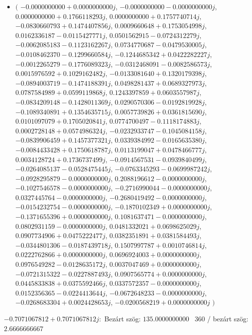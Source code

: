 \documentclass[14pt,a4paper]{article}
\begin{document}
\begin{itemize}
\item
$\big($
$-0.0000000000+0.0000000000j$, $-0.0000000000-0.0000000000j$, $0.0000000000+0.1766118293j$, $0.0000000000+0.1757740714j$, $-0.0830660793+0.1474407856j$, $0.0009660648+0.1753054998j$, $0.0162336187-0.0115427771j$, $0.0501562915-0.0724312279j$, $-0.0062085183-0.1123162267j$, $0.0734770687-0.0479530005j$, $-0.0108462370-0.1299660584j$, $-0.1244685342+0.0422282227j$, $-0.0012265279-0.1776089323j$, $-0.0312468091-0.0082586573j$, $0.0015976592+0.1029162482j$, $-0.0133081640+0.1320179398j$, $-0.0894003719-0.1474188391j$, $0.0498281437+0.0689327973j$, $0.0787584989+0.0599119868j$, $0.1243397859+0.0603557987j$, $-0.0834209148-0.1428011369j$, $0.0290570306-0.0192819928j$, $-0.1089340891+0.1354635715j$, $0.0057739826+0.0361815690j$, $0.0101097079+0.1705020841j$, $0.0774700497-0.1118174883j$, $0.0002728148+0.0574986324j$, $-0.0232933747-0.1045084158j$, $-0.0839906459+0.1457377321j$, $0.0339384992-0.0165635380j$, $-0.0084433428+0.1750618787j$, $0.0113199047+0.0478466777j$, $0.0034128724+0.1736737499j$, $-0.0914567531-0.0939840499j$, $-0.0264085137-0.0528475445j$, $-0.0763345293-0.0699987242j$, $-0.0928295879-0.0000000000j$, $0.2088196612-0.0000000000j$, $-0.1027546578-0.0000000000j$, $-0.2716990044-0.0000000000j$, $0.0327445764-0.0000000000j$, $-0.2680419492-0.0000000000j$, $-0.0154232754-0.0000000000j$, $-0.1870102349+0.0000000000j$, $-0.1371655396+0.0000000000j$, $0.1081637471-0.0000000000j$, $0.0802931159-0.0000000000j$, $0.0481332021+0.0698625029j$, $0.0907734906+0.0475222477j$, $0.0382351891+0.0381584493j$, $-0.0344801306-0.0187439718j$, $0.1507997787+0.0010746814j$, $0.0222762866+0.0000000000j$, $0.0696924003+0.0000000000j$, $0.0976549282-0.0128635172j$, $0.0037047469+0.0000000000j$, $-0.0721315322-0.0227887493j$, $0.0907565774+0.0000000000j$, $0.0445833838+0.0375592466j$, $0.0337572357-0.0000000000j$, $0.0152356365-0.0224413644j$, $-0.0672648233-0.0000000000j$, $-0.0268683304+0.0024428653j$, $-0.0200568219+0.0000000000j$
$\big)$
\end{itemize}
$-0.7071067812+0.7071067812j$:\
Bezárt szög: $135.0000000000$ \
360 / bezárt szög: $2.6666666667$\
\end{document}
